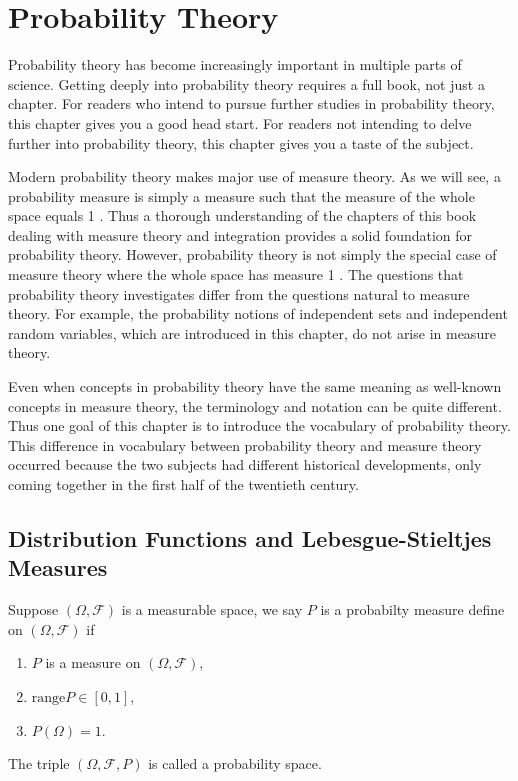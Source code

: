 \chapter{Probability Theory}
Probability theory has become increasingly important in multiple parts of science. Getting deeply into probability theory requires a full book, not just a chapter. For readers who intend to pursue further studies in probability theory, this chapter gives you a good head start. For readers not intending to delve further into probability theory, this chapter gives you a taste of the subject.

Modern probability theory makes major use of measure theory. As we will see, a probability measure is simply a measure such that the measure of the whole space equals 1 . Thus a thorough understanding of the chapters of this book dealing with measure theory and integration provides a solid foundation for probability theory.
However, probability theory is not simply the special case of measure theory where the whole space has measure 1 . The questions that probability theory investigates differ from the questions natural to measure theory. For example, the probability notions of independent sets and independent random variables, which are introduced in this chapter, do not arise in measure theory.

Even when concepts in probability theory have the same meaning as well-known concepts in measure theory, the terminology and notation can be quite different. Thus one goal of this chapter is to introduce the vocabulary of probability theory. This difference in vocabulary between probability theory and measure theory occurred because the two subjects had different historical developments, only coming together in the first half of the twentieth century.

\newpage
\section{Distribution Functions and Lebesgue-Stieltjes Measures}
\begin{sdefinition}{}{}
Suppose $(\Omega,\mathcal F)$ is a measurable space, we say $P$ is a probabilty measure define on $(\Omega,\mathcal F)$ if 
\begin{enumerate}
	\item $P$ is a measure on $(\Omega,\mathcal F)$,
	\item $\mathrm{range}P \in [0,1]$,
	\item $P(\Omega)=1$.
\end{enumerate}
The triple $(\Omega,\mathcal F,P)$ is called a probability space.
\end{sdefinition}

